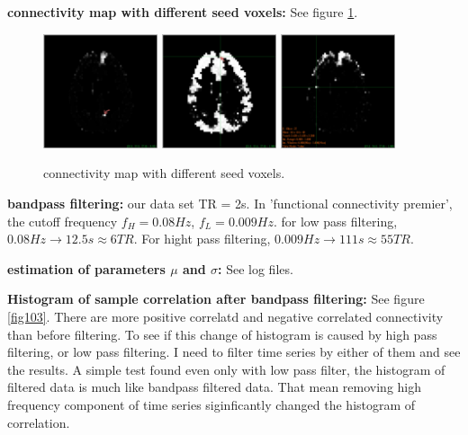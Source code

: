\documentclass[12pt]{article}
\begin{document}
\textbf{connectivity map with different seed voxels: } See figure \ref{fig102}.
\begin{figure}[htb]
\includegraphics[width = 0.3\textwidth]{probe1}
\includegraphics[width = 0.3\textwidth]{probe2}
\includegraphics[width = 0.3\textwidth]{probe3}
\caption{connectivity map with different seed voxels.}
\label{fig102}
\end{figure}

\textbf{bandpass filtering: } our data set TR = 2s. In 'functional connectivity premier', the cutoff frequency $f_H = 0.08 Hz$, $f_L = 0.009 Hz$.  for low pass filtering, $0.08 Hz \rightarrow 12.5s \approx 6 TR$. For hight pass filtering, $0.009Hz \rightarrow 111s \approx 55 TR$.

\textbf{estimation of parameters $\mu$ and $\sigma$: } See log files. 

\textbf{Histogram of sample correlation after bandpass filtering: } See figure \ref{fig103}. There are more positive correlatd and negative correlated connectivity than before filtering. To see if this change of histogram is caused by high pass filtering, or low pass filtering. I need to filter time series by either of them and see the results. A simple test found even only with low pass filter, the histogram of filtered data is much like bandpass filtered data. That mean removing high frequency component of time series siginficantly changed the histogram of correlation.
\end{document}
